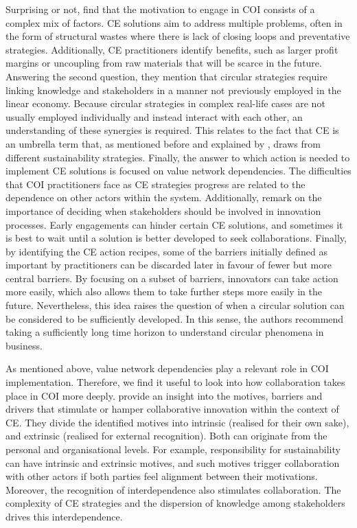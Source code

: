 Surprising or not, \citeauthor{blomsma2022making} find that the motivation to engage in COI consists of a complex mix of factors. CE solutions aim to address multiple problems, often in the form of structural wastes where there is lack of closing loops and preventative strategies. Additionally, CE practitioners identify benefits, such as larger profit margins or uncoupling from raw materials that will be scarce in the future. Answering the second question, they mention that circular strategies require linking knowledge and stakeholders in a manner not previously employed in the linear economy. Because circular strategies in complex real-life cases are not usually employed individually and instead interact with each other, an understanding of these synergies is required. This relates to the fact that CE is an umbrella term that, as mentioned before and explained by \cite{kalmykova2018circular}, draws from different sustainability strategies. Finally, the answer to which action is needed to implement CE solutions is focused on value network dependencies. The difficulties that COI practitioners face as CE strategies progress are related to the dependence on other actors within the system. Additionally, \cite{blomsma2022making} remark on the importance of deciding when stakeholders should be involved in innovation processes. Early engagements can hinder certain CE solutions, and sometimes it is best to wait until a solution is better developed to seek collaborations. Finally, by identifying the CE action recipes, some of the barriers initially defined as important by practitioners can be discarded later in favour of fewer but more central barriers. By focusing on a subset of barriers, innovators can take action more easily, which also allows them to take further steps more easily in the future. Nevertheless, this idea raises the question of when a circular solution can be considered to be sufficiently developed. In this sense, the authors recommend taking a sufficiently long time horizon to understand circular phenomena in business. 

As mentioned above, value network dependencies play a relevant role in COI implementation. Therefore, we find it useful to look into how collaboration takes place in COI more deeply. \cite{brown2019companies} provide an insight into the motives, barriers and drivers that stimulate or hamper collaborative innovation within the context of CE. They divide the identified motives into intrinsic (realised for their own sake), and extrinsic (realised for external recognition). Both can originate from the personal and organisational levels. For example, responsibility for sustainability can have intrinsic and extrinsic motives, and such motives trigger collaboration with other actors if both parties feel alignment between their motivations. Moreover, the recognition of interdependence also stimulates collaboration. The complexity of CE strategies and the dispersion of knowledge among stakeholders drives this interdependence. 

